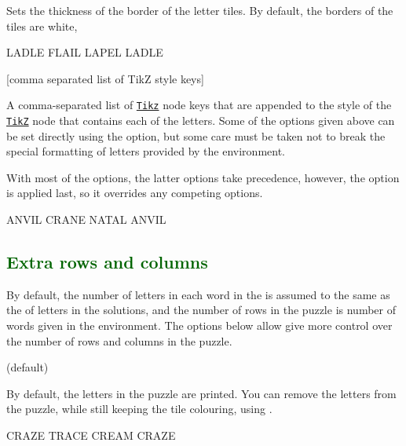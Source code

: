 \documentclass[svgnames]{report}
\newcommand\ctan[1]{\href{https://www.ctan.org/pkg/#1}{\texttt{#1}}}
\newcommand\Section[1]{\subsection{\textcolor{DarkGreen}{#1}}}
\begin{document}
  Sets the thickness of the border of the  letter tiles.
  By default, the borders of the tiles are white,

  \begin{example}
    \begin{wordle}[thickness=1mm, borders=red]{LADLE}
       FLAIL
       LAPEL
       LADLE
    \end{wordle}
  \end{example}

  [comma separated list of TikZ style keys]

  A comma-separated list of \ctan{Tikz} node keys that are appended to
  the style of the \ctan{TikZ} node that contains each of the
   letters.  Some of the options given above can be set
  directly using the  option, but some care must be
  taken not to break the special formatting of letters provided by the
   environment.\par

  With most of the  options, the latter options take
  precedence, however, the  option is applied last,
  so it overrides any competing options.

  \begin{example}
    \begin{wordle}[tile style={rotate=45}]{ANVIL}
      CRANE
      NATAL
      ANVIL
    \end{wordle}
  \end{example}

  \Section{Extra rows and columns}

  By default, the number of letters in each word in the 
  is assumed to the same as the of letters in the solutions, and the
  number of rows in the puzzle is number of words given in the
  environment. The options below allow give more control over the number
  of rows and columns in the puzzle.

   (default)\qquad

  By default, the letters in the puzzle are printed. You can remove the
  letters from the puzzle, while still keeping the  tile
  colouring, using .

  \begin{example}
    \begin{wordle}[letters]{CRAZE} %
      TRACE
      CREAM
      CRAZE
    \end{wordle}
  \end{example}
\end{document}
